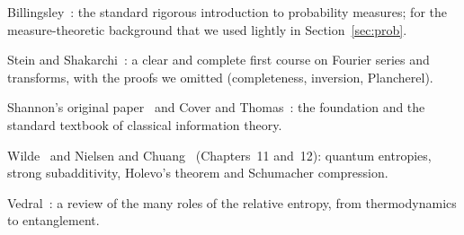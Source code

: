 \begin{furtherreading}
  \item Billingsley~\cite{billingsley1995}: the standard rigorous introduction to probability measures; for the measure-theoretic background that we used lightly in Section~\ref{sec:prob}.
  \item Stein and Shakarchi~\cite{steinshakarchi2003}: a clear and complete first course on Fourier series and transforms, with the proofs we omitted (completeness, inversion, Plancherel).
  \item Shannon's original paper~\cite{shannon1948} and Cover and Thomas~\cite{cover2006}: the foundation and the standard textbook of classical information theory.
  \item Wilde~\cite{wilde2017} and Nielsen and Chuang~\cite{nielsenchuang2010} (Chapters~11 and~12): quantum entropies, strong subadditivity, Holevo's theorem and Schumacher compression.
  \item Vedral~\cite{vedral2002}: a review of the many roles of the relative entropy, from thermodynamics to entanglement.
\end{furtherreading}
